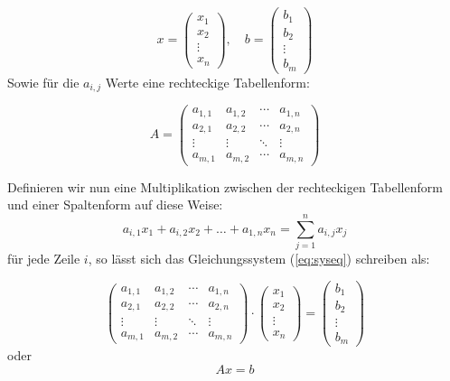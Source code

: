 \[
x = \begin{pmatrix}
x_1 \\
x_2 \\
\vdots \\
x_n
\end{pmatrix}, \quad b = \begin{pmatrix}
b_1 \\
b_2 \\
\vdots \\
b_m
\end{pmatrix}
\]
Sowie für die $a_{i,j}$ Werte eine rechteckige Tabellenform:

\[
A = \begin{pmatrix}
a_{1,1} & a_{1,2} & \cdots & a_{1,n} \\
a_{2,1} & a_{2,2} & \cdots & a_{2,n} \\
\vdots & \vdots & \ddots & \vdots \\
a_{m,1} & a_{m,2} & \cdots & a_{m,n}
\end{pmatrix}
\]

Definieren wir nun eine Multiplikation zwischen der rechteckigen Tabellenform und einer Spaltenform auf diese Weise:
\begin{equation*}
a_{i,1}x_1 + a_{i,2}x_2 + \dots + a_{1,n}x_n = \sum_{j=1}^{n} a_{i,j}x_j
\end{equation*}
für jede Zeile $i$, so lässt sich das Gleichungssystem (\ref{eq:syseq}) schreiben als:

\begin{equation*}
\begin{pmatrix}
a_{1,1} & a_{1,2} & \cdots & a_{1,n} \\
a_{2,1} & a_{2,2} & \cdots & a_{2,n} \\
\vdots & \vdots & \ddots & \vdots \\
a_{m,1} & a_{m,2} & \cdots & a_{m,n}
\end{pmatrix} \cdot \begin{pmatrix}
x_1 \\
x_2 \\
\vdots \\
x_n
\end{pmatrix} = \begin{pmatrix}
b_1 \\
b_2 \\
\vdots \\
b_m
\end{pmatrix}
\end{equation*}
oder
\begin{equation*}
Ax=b
\end{equation*}

